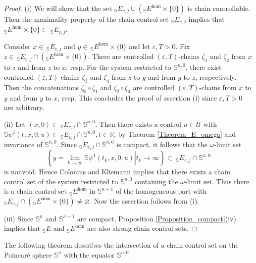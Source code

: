 \documentclass[preprint,12pt]{elsarticle}
\begin{document}
\begin{proof}
(i) We will show that the set $_{\mathbb{S}}E_{c,j}\cup\left(  _{\mathbb{S}%
}E^{\hom}\times\{0\}\right)  $ is chain controllable. Then the maximality
property of the chain control set $_{\mathbb{S}}E_{c,j}$ implies that
$_{\mathbb{S}}E^{\hom}\times\{0\}\subset\,_{\mathbb{S}}E_{c,j}$.

Consider $x\in\,_{\mathbb{S}}E_{c,j}$ and $y\in\,_{\mathbb{S}}E^{\hom}%
\times\{0\}$ and let $\varepsilon,T>0$. Fix $z\in\,_{\mathbb{S}}E_{c,j}%
\cap\left(  _{\mathbb{S}}E^{\hom}\times\{0\}\right)  $. There are controlled
$(\varepsilon,T)$-chains $\zeta_{1}$ and $\zeta_{2}$ from $x$ to $z$ and from
$z$ to $x$, resp. For the system restricted to $\mathbb{S}^{n,0}$, there exist
controlled $(\varepsilon,T)$-chains $\zeta_{3}$ and $\zeta_{4}$ from $z$ to
$y$ and from $y$ to $z$, respectively. Then the concatenations $\zeta_{3}%
\circ\zeta_{1}$ and $\zeta_{2}\circ\zeta_{4}$ are controlled $(\varepsilon
,T)$-chains from $x$ to $y$ and from $y$ to $x$, resp. This concludes the
proof of assertion (i) since $\varepsilon,T>0$ are arbitrary.

(ii) Let $(x,0)\in\,_{\mathbb{S}}E_{c,j}\cap\mathbb{S}^{n,0}$. Then there
exists a control $u\in\mathcal{U}$ with $\mathbb{S}\psi^{1}%
(t,x,0,u)\allowbreak\in\,_{\mathbb{S}}E_{c,j}\cap\mathbb{S}^{n,0}%
,t\in\mathbb{R}$, by Theorem \ref{Theorem_E_omega} and invariance of
$\mathbb{S}^{n,0}$. Since $_{\mathbb{S}}E_{c,j}\cap\mathbb{S}^{n,0}$ is
compact, it follows that the $\omega$-limit set%
\[
\left\{  \left.  y=\lim_{k\rightarrow\infty}\mathbb{S}\psi^{1}(t_{k}%
,x,0,u)\right\vert t_{k}\rightarrow\infty\right\}  \subset\,_{\mathbb{S}%
}E_{c,j}\cap\mathbb{S}^{n,0}%
\]
is nonvoid. Hence Colonius and Kliemann \cite[Corollary 4.3.12]{ColK00}
implies that there exists a chain control set of the system restricted to
$\mathbb{S}^{n,0}$ containing the $\omega$-limit set. Thus there is a chain
control set $_{\mathbb{S}}E^{\hom}$ in $\mathbb{S}^{n-1}$ of the homogeneous
part with $_{\mathbb{S}}E_{c,j}\cap\left(  _{\mathbb{S}}E^{\hom}%
\times\{0\}\right)  \not =\varnothing$. Now the assertion follows from (i).

(iii) Since $\mathbb{S}^{n}$ and $\mathbb{S}^{n-1}$ are compact, Proposition
\ref{Proposition_compact}(iv) implies that $_{\mathbb{S}}E$ and $_{\mathbb{S}%
}E^{\hom}$ are also strong chain control sets.
\end{proof}

The following theorem describes the intersection of a chain control set on the
Poincar\'{e} sphere $\mathbb{S}^{n}$ with the equator $\mathbb{S}^{n,0}$.
\end{document}
